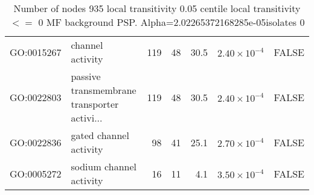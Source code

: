 \begin{table}[ht]
\begin{adjustbox}{max width=\textwidth}
\begin{tabular}{llrrrrl}
  GO:0015267 & channel activity & 119 & 48 & 30.5 & $2.40 \times 10^{-4}$ & FALSE \\ 
  GO:0022803 & passive transmembrane transporter activi... & 119 & 48 & 30.5 & $2.40 \times 10^{-4}$ & FALSE \\ 
  GO:0022836 & gated channel activity & 98 & 41 & 25.1 & $2.70 \times 10^{-4}$ & FALSE \\ 
  GO:0005272 & sodium channel activity & 16 & 11 & 4.1 & $3.50 \times 10^{-4}$ & FALSE \\ 
   \hline
\end{tabular}
\end{adjustbox}
\caption{Number of nodes 935 local transitivity 0.05 centile  local transitivity $<=$ 0 MF background PSP. Alpha=2.02265372168285e-05isolates 0} 
\label{tab:Number of nodes 935 local transitivity 0.05 centile  local transitivity $<=$ 0 MF background PSP. Alpha=2.02265372168285e-05isolates 0}
\end{table}

